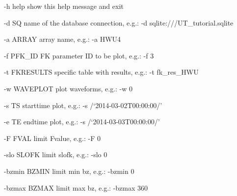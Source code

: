 \documentclass[letterpaper,10pt,english]{sphinxmanual}
\begin{document}
\begin{DUlineblock}{0em}
\item[] -h \textendash{}help    show this help message and exit
\item[] -d SQ        name of the database connection, e.g.: -d sqlite:///UT\_tutorial.sqlite
\item[] -a ARRAY     array name, e.g.: -a HWU4
\item[] -f PFK\_ID    FK parameter ID to be plot, e.g.: -f 3
\item[] -t FKRESULTS specific table with results, e.g.: -t fk\_res\_HWU
\item[] -w WAVEPLOT  plot waveforms, e.g.: -w 0
\item[] -s TS        starttime plot, e.g.: -s /‘2014-03-02T00:00:00/’
\item[] -e TE        endtime plot, e.g.: -s /‘2014-03-03T00:00:00/’
\item[] -F FVAL      limit Fvalue, e.g.: -F 0
\item[] -slo SLOFK   limit slofk, e.g.: -slo 0
\item[] -bzmin BZMIN limit min bz, e.g.: -bzmin 0
\item[] -bzmax BZMAX limit max bz, e.g.: -bzmax 360
\end{DUlineblock}

\begin{sphinxVerbatim}[commandchars=\\\{\}]
 \PYG{p}{[}\PYG{p}{]}       \PYG{p}{[} \PYG{p}{]} \PYG{p}{[} \PYG{p}{]} \PYG{p}{[} \PYG{p}{]} \PYG{p}{[} \PYG{p}{]} \PYG{p}{[} \PYG{p}{]} \PYG{p}{[} \PYG{p}{]} \PYG{p}{[} \PYG{p}{]} \PYG{p}{[} \PYG{p}{]}
\end{sphinxVerbatim}

\noindent{}

\noindent{}

\noindent{}
\end{document}
